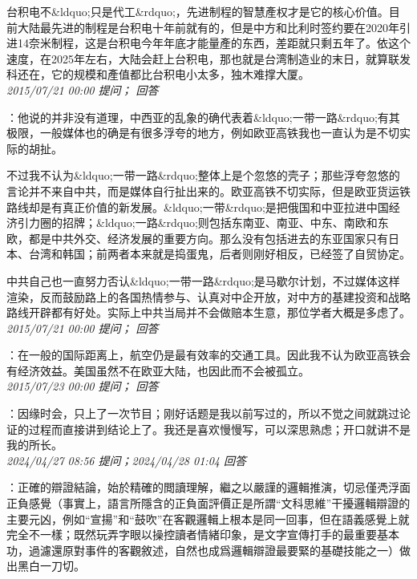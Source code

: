 \documentclass[twocolumn]{ctexart}
\begin{document}
台积电不\&ldquo;只是代工\&rdquo;，先进制程的智慧產权才是它的核心价值。目前大陆最先进的制程是台积电十年前就有的，但是中方和比利时签约要在2020年引进14奈米制程，这是台积电今年年底才能量產的东西，差距就只剩五年了。依这个速度，在2025年左右，大陆会赶上台积电，那也就是台湾制造业的末日，就算联发科还在，它的规模和產值都比台积电小太多，独木难撑大厦。\\

\textit{\hfill\noindent\small 2015/07/21 00:00 提问； 回答}

：他说的并非没有道理，中西亚的乱象的确代表着\&ldquo;一带一路\&rdquo;有其极限，一般媒体也的确是有很多浮夸的地方，例如欧亚高铁我也一直认为是不切实际的胡扯。

不过我不认为\&ldquo;一带一路\&rdquo;整体上是个忽悠的壳子；那些浮夸忽悠的言论并不来自中共，而是媒体自行扯出来的。欧亚高铁不切实际，但是欧亚货运铁路线却是有真正价值的新发展。\&ldquo;一带\&rdquo;是把俄国和中亚拉进中国经济引力圈的招牌；\&ldquo;一路\&rdquo;则包括东南亚、南亚、中东、南欧和东欧，都是中共外交、经济发展的重要方向。那么没有包括进去的东亚国家只有日本、台湾和韩国；前两者本来就是捣蛋鬼，后者则刚好相反，已经签了自贸协定。

中共自己也一直努力否认\&ldquo;一带一路\&rdquo;是马歇尔计划，不过媒体这样渲染，反而鼓励路上的各国热情参与、认真对中企开放，对中方的基建投资和战略路线开辟都有好处。实际上中共当局并不会做赔本生意，那位学者大概是多虑了。\\

\textit{\hfill\noindent\small 2015/07/21 00:00 提问； 回答}

：在一般的国际距离上，航空仍是最有效率的交通工具。因此我不认为欧亚高铁会有经济效益。美国虽然不在欧亚大陆，也因此而不会被孤立。\\

\textit{\hfill\noindent\small 2015/07/23 00:00 提问； 回答}

：因缘时会，只上了一次节目；刚好话题是我以前写过的，所以不觉之间就跳过论证的过程而直接讲到结论上了。我还是喜欢慢慢写，可以深思熟虑；开口就讲不是我的所长。\\

\textit{\hfill\noindent\small 2024/04/27 08:56 提问；2024/04/28 01:04 回答}

：正確的辯證結論，始於精確的閲讀理解，繼之以嚴謹的邏輯推演，切忌僅凴浮面正負感覺（事實上，語言所隱含的正負面評價正是所謂“文科思維”干擾邏輯辯證的主要元凶，例如“宣揚”和“鼓吹”在客觀邏輯上根本是同一回事，但在語義感覺上就完全不一樣；既然玩弄字眼以操控讀者情緒印象，是文字宣傳打手的最重要基本功，過濾還原對事件的客觀敘述，自然也成爲邏輯辯證最要緊的基礎技能之一）做出黑白一刀切。
\end{document}
